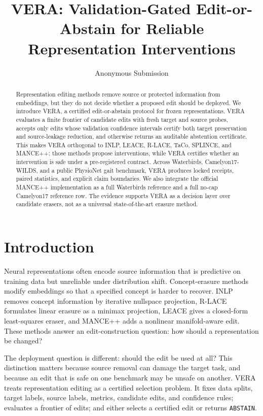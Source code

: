 \documentclass[letterpaper]{article}
\title{VERA: Validation-Gated Edit-or-Abstain for Reliable Representation Interventions}
\author{Anonymous Submission}
\begin{document}
\maketitle

\begin{abstract}
Representation editing methods remove source or protected information from
embeddings, but they do not decide whether a proposed edit should be deployed.
We introduce VERA, a certified edit-or-abstain protocol for frozen
representations. VERA evaluates a finite frontier of candidate edits with fresh
target and source probes, accepts only edits whose validation confidence
intervals certify both target preservation and source-leakage reduction, and
otherwise returns an auditable abstention certificate. This makes VERA
orthogonal to INLP, LEACE, R-LACE, TaCo, SPLINCE, and MANCE++: those methods
propose interventions, while VERA certifies whether an intervention is safe
under a pre-registered contract. Across Waterbirds, Camelyon17-WILDS, and a
public PhysioNet gait benchmark, VERA produces locked receipts, paired
statistics, and explicit claim boundaries. We also integrate the official
MANCE++ implementation as a full Waterbirds reference and a full no-cap
Camelyon17 reference row. The evidence supports VERA as a decision layer over
candidate erasers, not as a universal state-of-the-art erasure method.
\end{abstract}

\section{Introduction}

Neural representations often encode source information that is predictive on
training data but unreliable under distribution shift. Concept-erasure methods
modify embeddings so that a specified concept is harder to recover. INLP
removes concept information by iterative nullspace projection, R-LACE formulates
linear erasure as a minimax projection, LEACE gives a closed-form least-squares
eraser, and MANCE++ adds a nonlinear manifold-aware edit. These methods answer
an edit-construction question: how should a representation be changed?

The deployment question is different: should the edit be used at all? This
distinction matters because source removal can damage the target task, and
because an edit that is safe on one benchmark may be unsafe on another. VERA
treats representation editing as a certified selection problem. It fixes data
splits, target labels, source labels, metrics, candidate edits, and confidence
rules; evaluates a frontier of edits; and either selects a certified edit or
returns \texttt{ABSTAIN}.
\end{document}
